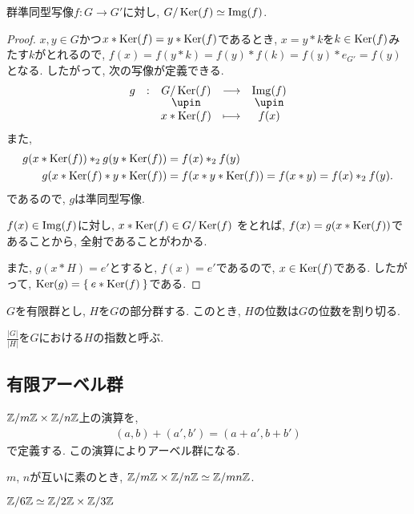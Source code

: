   \begin{theorem}
    群準同型写像$f\colon G \to G'$に対し,
    $G/\operatorname{Ker}(f)\simeq \operatorname{Img}(f)$.
  \end{theorem}
  \begin{proof}
    $x,y\in G$かつ$x\ast \operatorname{Ker}(f)=y\ast\operatorname{Ker}(f)$であるとき,
    $x=y\ast k$を$k\in \operatorname{Ker}(f)$みたす$k$がとれるので,
    $f(x)=f(y\ast k)=f(y)\ast f(k)=f(y)\ast e_{G'}=f(y)$となる.
    したがって, 次の写像が定義できる.
    \begin{align*}
      \shazo{g}{G/\Ker(f)}{\Img(f)}{x\ast \Ker(f)}{f(x)}
    \end{align*}
    また,
    \begin{align*}
      g(x\ast \operatorname{Ker}(f))\ast_2 g(y\ast \operatorname{Ker}(f))&=f(x)\ast_2 f(y) \\
      g(x\ast \operatorname{Ker}(f) \ast y\ast \operatorname{Ker}(f))&=f(x\ast y \ast \operatorname{Ker}(f))=f(x\ast y)=f(x)\ast_2 f(y).
    \end{align*}
    であるので, $g$は準同型写像.

    $f(x)\in \operatorname{Img}(f)$に対し, $x\ast \operatorname{Ker}(f) \in G/\operatorname{Ker}(f)$
    をとれば,
    $f(x)=g(x\ast \operatorname{Ker}(f))$であることから,
    全射であることがわかる.

    また, $g(x\ast H)=e'$とすると, $f(x)=e'$であるので, $x\in \operatorname{Ker}(f)$である.
    したがって, $\operatorname{Ker}(g)=\Set{e\ast \operatorname{Ker}(f)}$である.
  \end{proof}
  \begin{theorem}
    $G$を有限群とし, $H$を$G$の部分群する.
    このとき, $H$の位数は$G$の位数を割り切る.
  \end{theorem}
  \begin{definition}
    $\frac{|G|}{|H|}$を$G$における$H$の指数と呼ぶ.
  \end{definition}


  \subsection{有限アーベル群}
  $\mathbb{Z}/m\mathbb{Z} \times \mathbb{Z}/n\mathbb{Z}$上の演算を,
  \begin{align*}
    (a,b)+(a',b') = (a+a',b+b')
  \end{align*}
  で定義する.
  この演算によりアーベル群になる.
  \begin{theorem}
    $m$, $n$が互いに素のとき, $\mathbb{Z}/m\mathbb{Z} \times \mathbb{Z}/n\mathbb{Z} \simeq \mathbb{Z}/mn\mathbb{Z}$.
  \end{theorem}
  \begin{example}
    $\mathbb{Z}/6\mathbb{Z}\simeq \mathbb{Z}/2\mathbb{Z}\times \mathbb{Z}/3\mathbb{Z}$
  \end{example}
    
